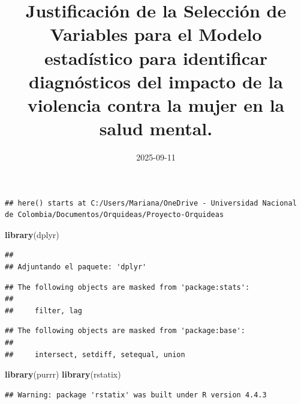 \documentclass[
]{article}
\title{Justificación de la Selección de Variables para el Modelo
estadístico para identificar diagnósticos del impacto de la violencia
contra la mujer en la salud mental.}
\author{}
\date{\vspace{-2.5em}2025-09-11}
\newenvironment{Shaded}{\begin{snugshade}}{\end{snugshade}}
\newcommand{\AttributeTok}[1]{\textcolor[rgb]{0.13,0.29,0.53}{#1}}
\newcommand{\ConstantTok}[1]{\textcolor[rgb]{0.56,0.35,0.01}{#1}}
\newcommand{\FunctionTok}[1]{\textcolor[rgb]{0.13,0.29,0.53}{\textbf{#1}}}
\newcommand{\NormalTok}[1]{#1}
\newcommand{\SpecialCharTok}[1]{\textcolor[rgb]{0.81,0.36,0.00}{\textbf{#1}}}
\begin{document}
\maketitle

{
\setcounter{tocdepth}{2}
\tableofcontents
}
\begin{Shaded}
\end{Shaded}

\begin{verbatim}
## here() starts at C:/Users/Mariana/OneDrive - Universidad Nacional de Colombia/Documentos/Orquideas/Proyecto-Orquideas
\end{verbatim}

\begin{Shaded}
\begin{Highlighting}[]
\FunctionTok{library}\NormalTok{(dplyr)}
\end{Highlighting}
\end{Shaded}

\begin{verbatim}
## 
## Adjuntando el paquete: 'dplyr'
\end{verbatim}

\begin{verbatim}
## The following objects are masked from 'package:stats':
## 
##     filter, lag
\end{verbatim}

\begin{verbatim}
## The following objects are masked from 'package:base':
## 
##     intersect, setdiff, setequal, union
\end{verbatim}

\begin{Shaded}
\begin{Highlighting}[]
\FunctionTok{library}\NormalTok{(purrr)}
\FunctionTok{library}\NormalTok{(rstatix)}
\end{Highlighting}
\end{Shaded}

\begin{verbatim}
## Warning: package 'rstatix' was built under R version 4.4.3
\end{verbatim}
\end{document}
